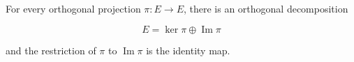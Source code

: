 For every orthogonal projection $\pi: E \rightarrow E$, there is an orthogonal decomposition

$$E = \ker \pi \oplus \operatorname{Im} \pi$$

and the restriction of $\pi$ to $\operatorname{Im} \pi$ is the identity map.
